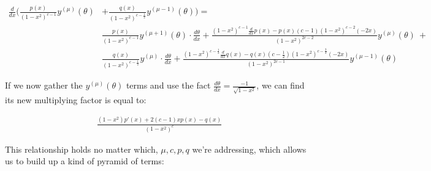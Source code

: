 \documentclass[10pt]{article}
\begin{document}
\begin{align*}
\frac{d}{dx} \Big( \frac{p(x)}{(1-x^2)^{c-1}} y^{(\mu)}(\theta) &+ \frac{q(x)}{(1-x^2)^{c -\frac{1}{2}}} y^{(\mu-1)}(\theta) \Big) = \\
&\frac{p(x)}{(1-x^2)^{c-1}} y^{(\mu+1)}(\theta) \cdot \frac{d\theta}{dx} + \frac{(1 - x^2)^{c-1} \frac{d}{dx} p(x) - p(x)(c-1)(1-x^2)^{c-2}(-2x)}{(1-x^2)^{2c - 2}} y^{(\mu)}(\theta)\ +\\
&\frac{q(x)}{(1-x^2)^{c-\frac{1}{2}}} y^{(\mu)} \cdot \frac{d\theta}{dx} + \frac{(1 - x^2)^{c-\frac{1}{2}} \frac{d}{dx} q(x) - q(x)(c-\frac{1}{2})(1-x^2)^{c-\frac{3}{2}}(-2x)}{(1-x^2)^{2c - 1}} y^{(\mu-1)}(\theta)
\end{align*} 

If we now gather the $y^{(\mu)}(\theta)$ terms and use the fact $\frac{d\theta}{dx} = \frac{-1}{\sqrt{1-x^2}}$, we can find its new multiplying factor is equal to:\vspace{-2mm}

\begin{align*}
\frac{(1-x^2)p'(x) + 2(c-1)xp(x) - q(x)}{(1 - x^2)^c}
\end{align*}

This relationship holds no matter which, $\mu, c, p, q$ we're addressing, which allows us to build up a kind of pyramid of terms:
\end{document}
